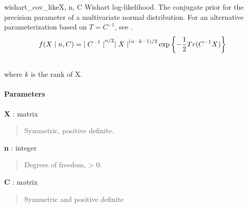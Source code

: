 \begin{funcdesc}{wishart\_cov\_like}{X, n, C}
\hypertarget{pymc.distributions.wishart_cov_like}{}
Wishart log-likelihood. The conjugate prior for the precision parameter of a multivariate normal distribution. For an alternative parameterization based on $T=C^{-1}$, see
\hyperlink{pymc.distributions.wishart_like}{}.
\begin{gather}
\begin{split}f(X \mid n, C) = {\mid C^{-1} \mid}^{n/2}{\mid X \mid}^{(n-k-1)/2} \exp\left\{ -\frac{1}{2} Tr(C^{-1}X) \right\}\end{split}\notag\\\begin{split}\end{split}\notag
\end{gather}
where $k$ is the rank of X.
\paragraph{Parameters}\begin{paramlist}

\item[] \textbf{X} : matrix
\begin{quote}

Symmetric, positive definite.
\end{quote}

\item[] \textbf{n} : integer
\begin{quote}

Degrees of freedom, \textgreater{} 0.
\end{quote}

\item[] \textbf{C} : matrix
\begin{quote}

Symmetric and positive definite
\end{quote}
\end{paramlist}
\end{funcdesc}



